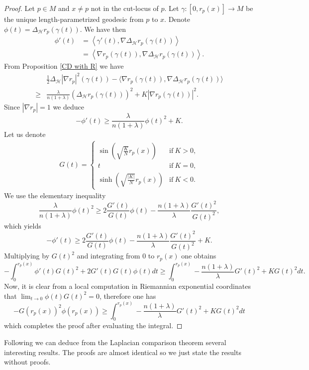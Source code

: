 \documentclass[11pt]{article}
\numberwithin{equation}{section}
\newcommand{\Ho}{\mathcal H}
\begin{document}
\begin{proof}
Let $p \in M$ and $x \neq p$ not in the cut-locus of $p$. Let $\gamma:[0,r_p(x)]\to M$ be the unique length-parametrized geodesic from $p$ to $x$. Denote $\phi (t)=\Delta_\Ho r_p (\gamma (t))$. We have then
\begin{align*}
    \phi'(t)&=\left\langle \gamma'(t), \nabla \Delta_\Ho r_p (\gamma (t)) \right\rangle \\
     &=\left\langle \nabla r_p (\gamma(t)), \nabla \Delta_\Ho r_p (\gamma (t)) \right\rangle.
\end{align*}
From Proposition \ref{CD with R} we have
\begin{align*}
 & \frac{1}{2}\Delta_{\mathcal{H}} | \nabla r_p|^2(\gamma(t))-\langle \nabla r_p (\gamma(t)) , \nabla \Delta_{\mathcal{H}} r_p (\gamma(t)) \rangle \\
\ge & \frac{\lambda}{n(1+\lambda)} (\Delta_\Ho r_p (\gamma(t)))^2 +K |\nabla r_p (\gamma(t))|^2.
\end{align*}
Since $| \nabla r_p|=1$ we deduce
\[
-\phi'(t) \ge \frac{\lambda}{n(1+\lambda)} \phi(t)^2+K.
\]
Let us denote
\begin{align*}
G(t) = 
\begin{cases}
  \sin \left(\sqrt { \frac{K}{N}} r_p(x) \right) &\text{if}\ K>0,
\\
\displaystyle t &\text{if}\ K = 0,
\\
 \sinh\left(\sqrt{\frac{|K|}{N}} r_p(x)\right) &\text{if}\ K<0.
\end{cases}
\end{align*}
We  use the elementary inequality
\[
 \frac{\lambda}{n(1+\lambda)} \phi(t)^2 \ge 2 \frac{G'(t)}{G(t)} \phi(t)-\frac{n(1+\lambda)}{\lambda} \frac{G'(t)^2}{G(t)^2},
\]
which yields
\[
-\phi'(t) \ge 2 \frac{G'(t)}{G(t)} \phi(t)-\frac{n(1+\lambda)}{\lambda} \frac{G'(t)^2}{G(t)^2} +K.
\]
Multiplying by $G(t)^2$ and integrating from $0$ to $r_p(x)$ one obtains
\[
-\int_0^{r_p(x)} \phi'(t)G(t)^2 +2 G'(t) G(t) \phi(t) dt \ge  \int_0^{r_p(x)} -\frac{n(1+\lambda)}{\lambda}  G'(t)^2+K G(t)^2 dt.
\]
Now, it is clear from a local computation in Riemannian exponential coordinates that $\lim_{t \to 0} \phi(t) G(t)^2 =0$, therefore one has
\[
-G(r_p(x))^2 \phi(r_p(x)) \ge  \int_0^{r_p(x)} -\frac{n(1+\lambda)}{\lambda}  G'(t)^2+K G(t)^2 dt
\]
which completes the proof after evaluating the integral.
\end{proof}

Following \cite{2025arXiv250913276B} we can deduce from the Laplacian comparison theorem several interesting results. The proofs are almost identical so we just state the results without proofs.
\end{document}
